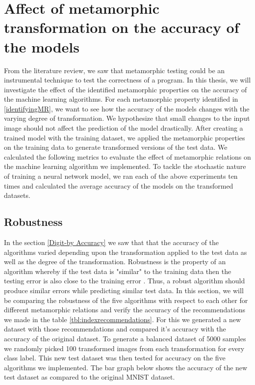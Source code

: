 \section{Affect of metamorphic transformation on the accuracy of the models}
From the literature review, we saw that metamorphic testing could be an instrumental technique to test the correctness of a program. In this thesis, we will investigate the effect of the identified metamorphic properties on the accuracy of the machine learning algorithms. For each metamorphic property identified in \ref{identifyingMR}, we want to see how the accuracy of the models changes with the varying degree of transformation. We hypothesize that small changes to the input image should not affect the prediction of the model drastically. After creating a trained model with the training dataset, we applied the metamorphic properties on the training data to generate transformed versions of the test data. We calculated the following metrics to evaluate the effect of metamorphic relations on the machine learning algorithm we implemented. To tackle the stochastic nature of training a neural network model, we ran each of the above experiments ten times and calculated the average accuracy of the models on the transformed datasets.


\clearpage
\subsection{Robustness}

In the section \ref{Digit-by Accuracy} we saw that that the accuracy of the algorithms varied depending upon the transformation applied to the test data as well as the degree of the transformation. Robustness is the property of an algorithm whereby if the test data is "similar" to the training data then the testing error is also close to the training error \cite{Xu2012}. Thus, a robust algorithm should produce similar errors while predicting similar test data. In this section, we will be comparing the robustness of the five algorithms with respect to each other for different metamorphic relations and verify the accuracy of the recommendations we made in the table \ref{tbl:indexrecommendations}. For this we generated a new dataset with those recommendations and compared it's accuracy with the accuracy of the original dataset. To generate a balanced dataset of 5000 samples we randomly picked 100 transformed images from each transformation for every class label. This new test dataset was then tested for accuracy on the five algorithms we implemented. The bar graph below shows the accuracy of the new test dataset as compared to the original MNIST dataset.


